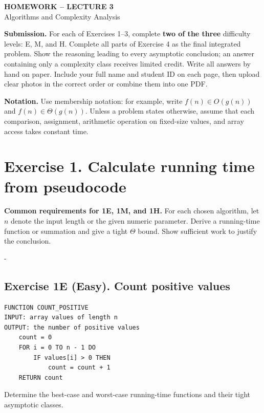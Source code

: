 \documentclass[11pt,a4paper]{article}
\makeatletter
\newcommand{\Needspace}[1]{\par\penalty-100\begingroup\setlength{\dimen@}{#1}\dimen@ii\pagegoal\advance\dimen@ii-\pagetotal\ifdim\dimen@>\dimen@ii\break\fi\endgroup}
\makeatother
\begin{document}
\begin{center}
    {\LARGE\bfseries\color{ForestGreen} HOMEWORK -- LECTURE 3}\\[0.4em]
    {\large Algorithms and Complexity Analysis}
\end{center}

\vspace{0.5em}

\begin{problembox}
\textbf{Submission.}
For each of Exercises 1--3, complete \textbf{two of the three} difficulty
levels: E, M, and H. Complete all parts of Exercise 4 as the final integrated
problem. Show the reasoning leading to every asymptotic conclusion; an answer
containing only a complexity class receives limited credit. Write all answers
by hand on paper. Include your full name and student ID on each page, then
upload clear photos in the correct order or combine them into one PDF.
\end{problembox}

\begin{problembox}
\textbf{Notation.}
Use membership notation: for example, write $f(n)\in O(g(n))$ and
$f(n)\in\Theta(g(n))$. Unless a problem states otherwise, assume that each
comparison, assignment, arithmetic operation on fixed-size values, and array
access takes constant time.
\end{problembox}

\section{Exercise 1. Calculate running time from pseudocode}

\begin{problembox}
\textbf{Common requirements for 1E, 1M, and 1H.}
For each chosen algorithm, let $n$ denote the input length or the given numeric
parameter. Derive a running-time function or summation and give a tight
$\Theta$ bound. Show sufficient work to justify the conclusion.
\end{problembox}

\Needspace{0.30\textheight}
\subsection*{Exercise 1E (Easy). Count positive values}

\begin{problembox}
\begin{lstlisting}[style=pseudo]
FUNCTION COUNT_POSITIVE
INPUT: array values of length n
OUTPUT: the number of positive values
    count = 0
    FOR i = 0 TO n - 1 DO
        IF values[i] > 0 THEN
            count = count + 1
    RETURN count
\end{lstlisting}

Determine the best-case and worst-case running-time functions and their tight
asymptotic classes.
\end{problembox}
\end{document}

